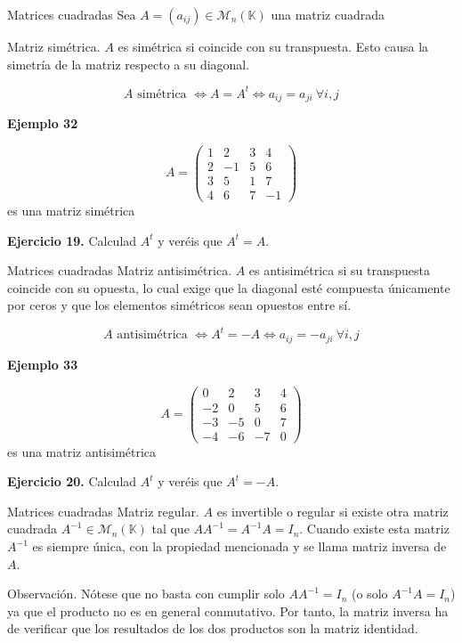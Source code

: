 \documentclass[
  ignorenonframetext,
]{beamer}
\begin{document}
\begin{frame}{Matrices cuadradas}
\protect\hypertarget{matrices-cuadradas-8}{}
Sea \(A=(a_{ij})\in\mathcal{M}_n(\mathbb{K})\) una matriz cuadrada

Matriz simétrica. \(A\) es simétrica si coincide con su transpuesta.
Esto causa la simetría de la matriz respecto a su diagonal.

\[A\text{ simétrica }\Leftrightarrow A=A^t\Leftrightarrow a_{ij}=a_{ji}\ \forall i,j\]

\textbf{Ejemplo 32}

\[A = \begin{pmatrix}1&2&3&4\\2&-1&5&6\\3&5&1&7\\4&6&7&-1\end{pmatrix}\]
es una matriz simétrica

\textbf{Ejercicio 19.} Calculad \(A^t\) y veréis que \(A^t=A\).
\end{frame}

\begin{frame}{Matrices cuadradas}
\protect\hypertarget{matrices-cuadradas-9}{}
Matriz antisimétrica. \(A\) es antisimétrica si su transpuesta coincide
con su opuesta, lo cual exige que la diagonal esté compuesta únicamente
por ceros y que los elementos simétricos sean opuestos entre sí.

\[A\text{ antisimétrica }\Leftrightarrow A^t=-A\Leftrightarrow a_{ij}=-a_{ji}\ \forall i,j\]

\textbf{Ejemplo 33}

\[A = \begin{pmatrix}0&2&3&4\\-2&0&5&6\\-3&-5&0&7\\-4&-6&-7&0\end{pmatrix}\]
es una matriz antisimétrica

\textbf{Ejercicio 20.} Calculad \(A^t\) y veréis que \(A^t=-A\).
\end{frame}

\begin{frame}{Matrices cuadradas}
\protect\hypertarget{matrices-cuadradas-10}{}
Matriz regular. \(A\) es invertible o regular si existe otra matriz
cuadrada \(A^{-1}\in\mathcal{M}_n(\mathbb{K})\) tal que
\(AA^{-1}=A^{-1}A=I_n\). Cuando existe esta matriz \(A^{-1}\) es siempre
única, con la propiedad mencionada y se llama matriz inversa de \(A\).

Observación. Nótese que no basta con cumplir solo \(AA^{-1}=I_n\) (o
solo \(A^{-1}A=I_n\)) ya que el producto no es en general conmutativo.
Por tanto, la matriz inversa ha de verificar que los resultados de los
dos productos son la matriz identidad.
\end{frame}
\end{document}
